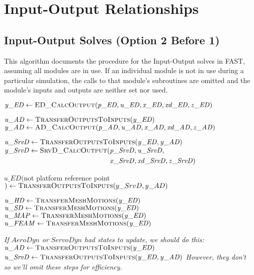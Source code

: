\documentclass[10pt,letterpaper,oneside,notitlepage]{article}
\begin{document}
\section{Input-Output Relationships}
\subsection {Input-Output Solves (Option 2 Before 1)}
This algorithm documents the procedure for the Input-Output solves in FAST, assuming
all modules are in use. If an individual module is not in use during a particular
simulation, the calls to that module's subroutines are omitted and the module's 
inputs and outputs are neither set nor used.

\begin{algorithmic}[1]
\State $\mathit{y\_ED} \gets \Call{ED\_CalcOutput}{\mathit{p\_ED},\mathit{u\_ED},\mathit{x\_ED},\mathit{xd\_ED},\mathit{z\_ED}}$

\State
	\State $\mathit{u\_AD} \gets \Call{TransferOutputsToInputs}{\mathit{y\_ED}}$
	\State $\mathit{y\_AD} \gets \Call{AD\_CalcOutput}{\mathit{p\_AD},\mathit{u\_AD},\mathit{x\_AD},\mathit{xd\_AD},\mathit{z\_AD}}$

\State
	\State $\mathit{u\_SrvD} \gets \Call{TransferOutputsToInputs}{\mathit{y\_ED},\mathit{y\_AD}}$
	\State $\mathit{y\_SrvD} \gets \Call{SrvD\_CalcOutput}{}( \!
				\begin{aligned}[t]
				                      & \mathit{p\_SrvD},\mathit{u\_SrvD}, \\
	                            & \mathit{x\_SrvD},\mathit{xd\_SrvD},\mathit{z\_SrvD}) \\
				\end{aligned}$

\State
	\State $\mathit{u\_ED}($not platform reference point$) \gets \Call{TransferOutputsToInputs}{y\_SrvD,y\_AD}$ %

	\State $\mathit{u\_HD}   \gets \Call{TransferMeshMotions}{\mathit{y\_ED}}$
	\State $\mathit{u\_SD}   \gets \Call{TransferMeshMotions}{\mathit{y\_ED}}$
	\State $\mathit{u\_MAP}  \gets \Call{TransferMeshMotions}{\mathit{y\_ED}}$
	\State $\mathit{u\_FEAM} \gets \Call{TransferMeshMotions}{\mathit{y\_ED}}$

\State
\State {}
\State
\textit{
\State If $AeroDyn$ or $ServoDyn$ had states to update, we should do this:
\State\hspace{\algorithmicindent} $\mathit{u\_AD} \gets \Call{TransferOutputsToInputs}{\mathit{y\_ED}}$
\State\hspace{\algorithmicindent} $\mathit{u\_SrvD} \gets \Call{TransferOutputsToInputs}{\mathit{y\_ED},\mathit{y\_AD}}$
\State However, they don't so we'll omit these steps for efficiency.
}
\EndProcedure
\end{algorithmic}
\end{document}
